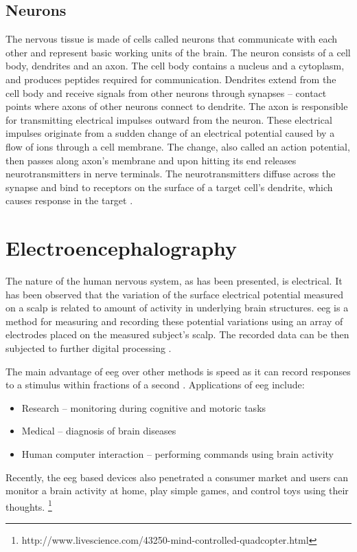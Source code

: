 \subsection{Neurons}
The nervous tissue is made of cells called neurons that communicate with each
other and represent basic working units of the brain. The neuron consists of a cell
body, dendrites and an axon. The cell body contains a nucleus and a cytoplasm, and
produces peptides required for communication. Dendrites extend from the cell body and
receive signals from other neurons through synapses -- contact points where
axons of other neurons connect to dendrite. The axon is responsible for transmitting
electrical impulses outward from the neuron. These electrical impulses originate
from a sudden change of an electrical potential caused by a flow of ions through a cell
membrane. The change, also called an action potential, then passes along axon's
membrane and upon hitting its end releases neurotransmitters in nerve terminals.
The neurotransmitters diffuse across the synapse and bind to receptors on the surface
of a target cell's dendrite, which causes response in the target \cite{brainFacts}.

\section{Electroencephalography}
The nature of the human nervous system, as has been presented, is electrical. It has
been observed that the variation of the surface electrical potential measured on a
scalp is related to amount of activity in underlying brain structures. \gls{eeg} is a
method for measuring and recording these potential variations using an array of electrodes
placed on the measured subject's scalp. The recorded data can be then subjected to further digital processing \cite{eegClass}.

The main advantage of \gls{eeg} over other methods is speed as it can record responses
to a stimulus within fractions of a second \cite{eegFund}. Applications of \gls{eeg}
include:
\begin{itemize}
  \item Research -- monitoring during cognitive and motoric tasks
  \item Medical -- diagnosis of brain diseases
  \item Human computer interaction -- performing commands using brain activity  
\end{itemize}
Recently, the \gls{eeg} based devices also penetrated a consumer market and users can
monitor a brain activity at home, play simple games, and control toys using
their thoughts. \footnote{http://www.livescience.com/43250-mind-controlled-quadcopter.html}

